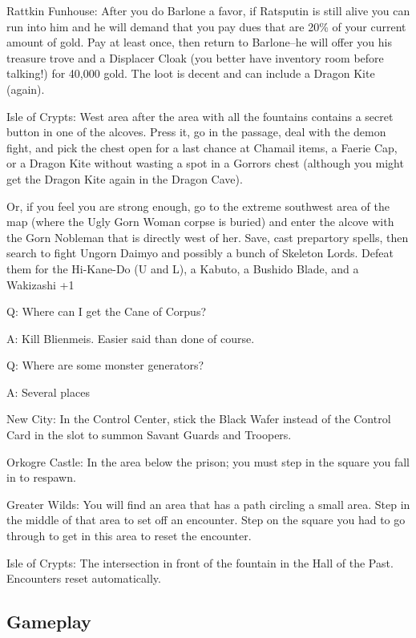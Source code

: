 \documentclass[12pt]{article}
\begin{document}
Rattkin Funhouse: After you do Barlone a favor, if Ratsputin is still
alive you can run into him and he will demand that you pay dues that are
20\% of your current amount of gold. Pay at least once, then return to
Barlone--he will offer you his treasure trove and a Displacer Cloak (you
better have inventory room before talking!) for 40,000 gold. The loot is
decent and can include a Dragon Kite (again).

Isle of Crypts: West area after the area with all the fountains contains
a secret button in one of the alcoves. Press it, go in the passage, deal
with the demon fight, and pick the chest open for a last chance at
Chamail items, a Faerie Cap, or a Dragon Kite without wasting a spot in
a Gorrors chest (although you might get the Dragon Kite again in the
Dragon Cave).

             Or, if you feel you are strong enough, go to the extreme
             southwest area of the map (where the Ugly Gorn Woman corpse
             is buried) and enter the alcove with the Gorn Nobleman that is
             directly west of her.  Save, cast prepartory spells, then
             search to fight Ungorn Daimyo and possibly a bunch of Skeleton
             Lords.  Defeat them for the Hi-Kane-Do (U and L), a Kabuto, a
             Bushido Blade, and a Wakizashi +1

Q: Where can I get the Cane of Corpus?

A: Kill Blienmeis. Easier said than done of course.

Q: Where are some monster generators?

A: Several places

New City: In the Control Center, stick the Black Wafer instead of the
Control Card in the slot to summon Savant Guards and Troopers.

Orkogre Castle: In the area below the prison; you must step in the
square you fall in to respawn.

Greater Wilds: You will find an area that has a path circling a small
area. Step in the middle of that area to set off an encounter. Step on
the square you had to go through to get in this area to reset the
encounter.

Isle of Crypts: The intersection in front of the fountain in the Hall of
the Past. Encounters reset automatically.

\subsection{Gameplay}\label{gameplay}
\end{document}
